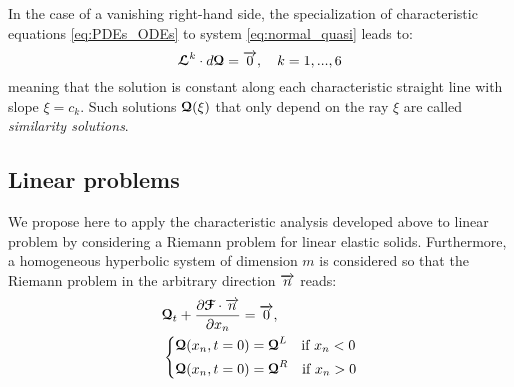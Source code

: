 \begin{remark}
  In the case of a vanishing right-hand side, the specialization of characteristic equations \eqref{eq:PDEs_ODEs} to system \eqref{eq:normal_quasi} leads to:
\begin{equation}
  \label{eq:characteristic_equations_homogeneous}
  {\boldsymbol{\mathcal{L}}}^k \cdot d{\boldsymbol{\mathcal{Q}}} = {\overrightarrow{0}},\quad k=1,...,6
\end{equation}
meaning that the solution is constant along each characteristic straight line with slope $\xi = c_k$. Such solutions ${\boldsymbol{\mathcal{Q}}}(\xi)$ that only depend on the ray $\xi$ are called \textit{similarity solutions}.
\end{remark}

\subsection{Linear problems}
\label{subsec:charac_Linear_problems}
We propose here to apply the characteristic analysis developed above to linear problem by considering a Riemann problem for linear elastic solids. Furthermore, a homogeneous hyperbolic system of dimension $m$ is considered so that the Riemann problem in the arbitrary direction ${\overrightarrow{n}}$ reads:
\begin{equation}
  \label{eq:Linear_Riemann_problem}
  \begin{aligned}
  &{\boldsymbol{\mathcal{Q}}}_t + \frac{\partial {\boldsymbol{\mathcal{F}}}\cdot {\overrightarrow{n}}}{\partial x_n} = {\overrightarrow{0}}, \\
  &\left\lbrace 
    \begin{aligned}
      & {\boldsymbol{\mathcal{Q}}}(x_n,t=0) = {\boldsymbol{\mathcal{Q}}}^L \quad \text{if } x_n< 0\\
      & {\boldsymbol{\mathcal{Q}}}(x_n,t=0) = {\boldsymbol{\mathcal{Q}}}^R \quad \text{if } x_n> 0
    \end{aligned}
    \right.
  \end{aligned}
\end{equation}

